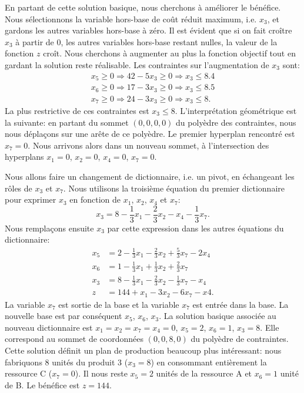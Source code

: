 \begin{example}[Production]
En partant de cette solution basique, nous cherchons à améliorer le bénéfice.
Nous sélectionnons la variable hors-base de coût réduit maximum, i.e. $x_3$, et gardons les autres variables hors-base à zéro.
Il est évident que si on fait croître $x_3$ à partir de 0, les autres variables hors-base restant nulles, la valeur de la fonction $z$ croît.
Nous cherchons à augmenter au plus la fonction objectif tout en gardant la solution reste réalisable.
Les contraintes sur l'augmentation de $x_3$ sont:
\begin{align*}
x_5 \geq 0 \Rightarrow 42 - 5x_3 \geq 0 \Rightarrow x_3 \leq 8.4 \\
x_6 \geq 0 \Rightarrow 17 - 3x_3 \geq 0 \Rightarrow x_3 \leq 8.5 \\
x_7 \geq 0 \Rightarrow 24 - 3x_3 \geq 0 \Rightarrow x_3 \leq 8.
\end{align*}
La plus restrictive de ces contraintes est $x_3 \leq 8$.
L'interprétation géométrique est la suivante: en partant du sommet $(0, 0, 0, 0)$ du polyèdre des contraintes, nous nous déplaçons sur une arête de ce polyèdre.
Le premier hyperplan rencontré est $x_7 = 0$.
Nous arrivons alors dans un nouveau sommet, à l'intersection des hyperplans $x_1 = 0$, $x_2 = 0$, $x_4 = 0$, $x_7 = 0$.

Nous allons faire un changement de dictionnaire, i.e. un pivot, en échangeant les rôles de $x_3$ et $x_7$.
Nous utilisons la troisième équation du premier dictionnaire pour exprimer $x_3$ en fonction de $x_1$, $x_2$, $x_4$ et $x_7$:
\[
x_3 = 8 - \frac{1}{3} x_1 - \frac{2}{3} x_2 - x_4 - \frac{1}{3} x_7.
\]
Nous remplaçons ensuite $x_3$ par cette expression dans les autres équations du dictionnaire:
\begin{align*}
x_5 &= 2 - \frac{1}{3}x_1 - \frac{2}{3}x_2 + \frac{5}{3}x_7 - 2x_4 \\
x_6 &= 1 - \frac{1}{3}x_1 + \frac{1}{3}x_2 + \frac{2}{3}x_7 \\
x_3 &= 8 - \frac{1}{3}x_1 - \frac{2}{3}x_2 - \frac{1}{3}x_7 - x_4 \\
z &= 144 + x_1 - 3x_2 - 6x_7 - x4.
\end{align*}
La variable $x_7$ est sortie de la base et la variable $x_7$ est entrée dans la base.
La nouvelle base est par conséquent $x_5$, $x_6$, $x_3$.
La solution basique associée au nouveau dictionnaire est $x_1 = x_2 = x_7 = x_4 = 0$, $x_5 = 2$, $x_6 = 1$, $x_3 = 8$.
Elle correspond au sommet de coordonnées $(0, 0, 8, 0)$ du polyèdre de contraintes.
Cette solution définit un plan de production beaucoup plus intéressant: nous fabriquons 8 unités du produit 3 ($x_3 = 8$) en consommant entièrement la ressource C ($x_7 = 0$).
Il nous reste $x_5 = 2$ unités de la ressource A et $x_6 = 1$ unité de B.
Le bénéfice est $z = 144$.


\end{example}
